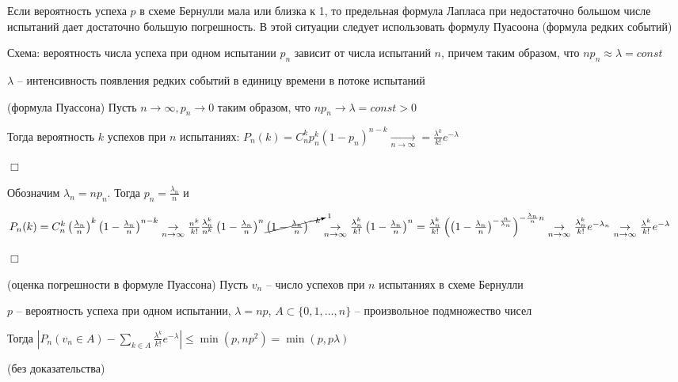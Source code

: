 \documentclass[12pt]{article}
\begin{document}
    \Nota Если вероятность успеха $p$ в схеме Бернулли мала или близка к 1, то предельная формула Лапласа при недостаточно большом
    числе испытаний дает достаточно большую погрешность. В этой ситуации следует использовать формулу Пуасоона (формула редких событий)

    Схема: вероятность числа успеха при одном испытании $p_n$ зависит от числа испытаний $n$, причем таким образом, что $n p_n \approx \lambda = const$

    $\lambda$ -- интенсивность появления редких событий в единицу времени в потоке испытаний

    \begin{MyTheorem}
         (формула Пуассона) Пусть $n \to \infty, p_n \to 0$ таким образом, что $n p_n \to \lambda = const > 0$

        Тогда вероятность $k$ успехов при $n$ испытаниях: $P_n(k) = C^k_n p_n^k (1 - p_n)^{n - k} \underset{n \to \infty}{\rightarrow} = \frac{\lambda^k}{k!} e^{-\lambda}$
    \end{MyTheorem}

    \begin{MyProof}
        $\Box$

        Обозначим $\lambda_n = n p_n$. Тогда $p_n = \frac{\lambda_n}{n}$ и

        $P_n(k) = C^k_n \left(\frac{\lambda_n}{n}\right)^k \left(1 - \frac{\lambda_n}{n}\right)^{n - k} \underset{n \to \infty}{\rightarrow} 
        \frac{n^k}{k!} \frac{\lambda^k_n}{n^k} \left(1 - \frac{\lambda_n}{n}\right)^n \cancelto{1}{\left(1 - \frac{\lambda_n}{n}\right)^{-k}}
        \underset{n \to \infty}{\rightarrow} \frac{\lambda_n^k}{k!} \left(1 - \frac{\lambda_n}{n}\right)^n = \frac{\lambda_n^k}{k!} \left(\left(1 - \frac{\lambda_n}{n}\right)^{-\frac{n}{\lambda_n}}\right)^{-\frac{\lambda_n}{n}n} \underset{n \to \infty}{\rightarrow} \frac{\lambda_n^k}{k!} e^{-\lambda_n} \underset{n \to \infty}{\rightarrow} \frac{\lambda^k}{k!} e^{-\lambda}$

        $\Box$
    \end{MyProof}

    \hypertarget{errorinpoissonformula}{}

    \begin{MyTheorem}
         (оценка погрешности в формуле Пуассона) Пусть $v_n$ -- число успехов при $n$ испытаниях в схеме Бернулли

        $p$ -- вероятность успеха при одном испытании, $\lambda = np$, $A \subset \{0, 1, \dots, n\}$ -- произвольное подмножество чисел

        Тогда $|P_n (v_n \in A) - \sum_{k \in A} \frac{\lambda^k}{k!} e^{-\lambda}| \leq \min (p, np^2) = \min (p, p\lambda)$

        (без доказательства)
    \end{MyTheorem}
\end{document}
